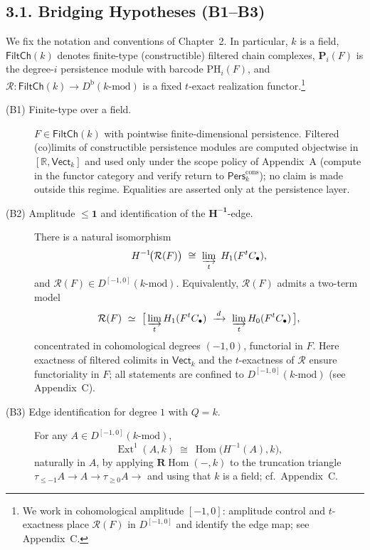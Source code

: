 \documentclass[11pt]{article}
\numberwithin{equation}{section}
\theoremstyle{plain}
\theoremstyle{definition}
\theoremstyle{remark}
\DeclareMathOperator{\Ext}{Ext}
\DeclareMathOperator{\Hom}{Hom}
\newcommand{\Pers}{\mathsf{Pers}}
\theoremstyle{plain}
\theoremstyle{definition}
\numberwithin{equation}{section}
\theoremstyle{definition}
\numberwithin{equation}{section}
\theoremstyle{plain}
\theoremstyle{definition}
\theoremstyle{remark}
\begin{document}
\subsection*{3.1. Bridging Hypotheses (B1–B3)}
We fix the notation and conventions of Chapter~2. In particular, \(k\) is a field, \(\mathsf{FiltCh}(k)\) denotes finite-type (constructible) filtered chain complexes, \(\mathbf{P}_i(F)\) is the degree-\(i\) persistence module with barcode \(\mathrm{PH}_i(F)\), and \(\mathcal{R}:\mathsf{FiltCh}(k)\to D^{\mathrm{b}}(k\text{-mod})\) is a fixed \(t\)-exact realization functor.\footnote{We work in cohomological amplitude \([-1,0]\): amplitude control and \(t\)-exactness place \(\mathcal{R}(F)\) in \(D^{[-1,0]}\) and identify the edge map; see Appendix~C.}

\begin{description}
\item[\normalfont (B1) Finite-type over a field.]
\(F\in\mathsf{FiltCh}(k)\) with pointwise finite-dimensional persistence. Filtered (co)limits of constructible persistence modules are computed objectwise in \([\mathbb{R},\mathsf{Vect}_k]\) and used only under the scope policy of Appendix~A (compute in the functor category and verify return to \(\Pers^{\mathrm{cons}}_k\)); no claim is made outside this regime. Equalities are asserted only at the persistence layer.

\item[\normalfont (B2) Amplitude \(\boldsymbol{\le 1}\) and identification of the \(\boldsymbol{H^{-1}}\)-edge.]
There is a natural isomorphism
\[
H^{-1}\!\big(\mathcal{R}(F)\big)\ \cong\ \varinjlim_{t}\ H_1(F^{t}C_\bullet),
\]
and \(\mathcal{R}(F)\in D^{[-1,0]}(k\text{-mod})\).
Equivalently, \(\mathcal{R}(F)\) admits a two-term model
\[
\mathcal{R}(F)\ \simeq\ \bigl[\, \varinjlim_{t} H_1(F^{t}C_\bullet)\ \xrightarrow{\,d\,}\ \varinjlim_{t} H_0(F^{t}C_\bullet)\, \bigr],
\]
concentrated in cohomological degrees \((-1,0)\), functorial in \(F\).
Here exactness of filtered colimits in \(\mathsf{Vect}_k\) and the \(t\)-exactness of \(\mathcal{R}\) ensure functoriality in \(F\); all statements are confined to \(D^{[-1,0]}(k\text{-mod})\) (see Appendix~C).

\item[\normalfont (B3) Edge identification for degree \(1\) with \(Q=k\).]
For any \(A\in D^{[-1,0]}(k\text{-mod})\),
\[
\Ext^1(A,k)\ \cong\ \Hom\!\big(H^{-1}(A),k\big),
\]
naturally in \(A\), by applying \(\mathbf{R}\!\operatorname{Hom}(-,k)\) to the truncation triangle \(\tau_{\le -1}A\to A\to \tau_{\ge 0}A\to\) and using that \(k\) is a field; cf.\ Appendix~C.
\end{description}
\end{document}

